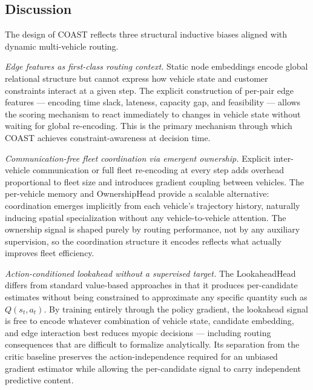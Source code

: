 \subsection{Discussion}\label{sec:method_discussion}

The design of COAST reflects three structural inductive biases aligned with dynamic multi-vehicle routing.

\textit{Edge features as first-class routing context.}
Static node embeddings encode global relational structure but cannot express how vehicle state and customer constraints interact at a given step.
The explicit construction of per-pair edge features --- encoding time slack, lateness, capacity gap, and feasibility --- allows the scoring mechanism to react immediately to changes in vehicle state without waiting for global re-encoding.
This is the primary mechanism through which COAST achieves constraint-awareness at decision time.

\textit{Communication-free fleet coordination via emergent ownership.}
Explicit inter-vehicle communication or full fleet re-encoding at every step adds overhead proportional to fleet size and introduces gradient coupling between vehicles.
The per-vehicle memory and OwnershipHead provide a scalable alternative: coordination emerges implicitly from each vehicle's trajectory history, naturally inducing spatial specialization without any vehicle-to-vehicle attention.
The ownership signal is shaped purely by routing performance, not by any auxiliary supervision, so the coordination structure it encodes reflects what actually improves fleet efficiency.

\textit{Action-conditioned lookahead without a supervised target.}
The LookaheadHead differs from standard value-based approaches in that it produces per-candidate estimates without being constrained to approximate any specific quantity such as $Q(s_t, a_t)$.
By training entirely through the policy gradient, the lookahead signal is free to encode whatever combination of vehicle state, candidate embedding, and edge interaction best reduces myopic decisions --- including routing consequences that are difficult to formalize analytically.
Its separation from the critic baseline preserves the action-independence required for an unbiased gradient estimator while allowing the per-candidate signal to carry independent predictive content.

